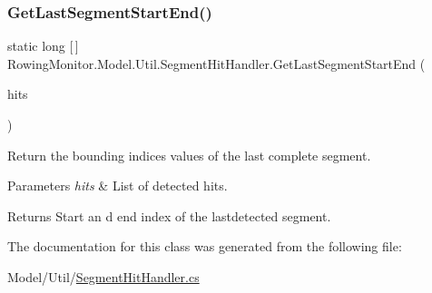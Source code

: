 \subsubsection{\texorpdfstring{Get\+Last\+Segment\+Start\+End()}{GetLastSegmentStartEnd()}}
{\footnotesize\ttfamily static long \mbox{[}$\,$\mbox{]} Rowing\+Monitor.\+Model.\+Util.\+Segment\+Hit\+Handler.\+Get\+Last\+Segment\+Start\+End (\begin{DoxyParamCaption}\item[{List$<$ \hyperlink{struct_rowing_monitor_1_1_model_1_1_util_1_1_segment_hit}{Segment\+Hit} $>$}]{hits }\end{DoxyParamCaption})\hspace{0.3cm}{\ttfamily [static]}}



Return the bounding indices values of the last complete segment. 


\begin{DoxyParams}{Parameters}
{\em hits} & List of detected hits.\\
\hline
\end{DoxyParams}
\begin{DoxyReturn}{Returns}
Start an d end index of the lastdetected segment.
\end{DoxyReturn}


The documentation for this class was generated from the following file\+:\begin{DoxyCompactItemize}
\item 
Model/\+Util/\hyperlink{_segment_hit_handler_8cs}{Segment\+Hit\+Handler.\+cs}\end{DoxyCompactItemize}
